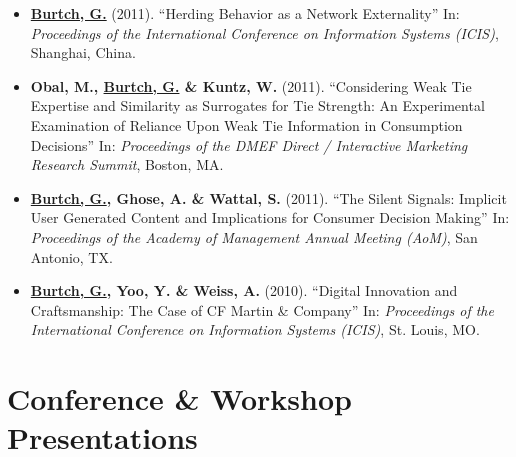 \documentclass[10.5pt,letterpaper,sans]{moderncv}        %
\begin{document}
\begin{itemize}
\item \textbf{\underline{Burtch, G.}} (2011). ``Herding Behavior as a Network Externality'' In: \textit{Proceedings of the International Conference on Information Systems (ICIS)}, Shanghai, China.

\item \textbf{Obal, M., \underline{Burtch, G.} \& Kuntz, W.} (2011). ``Considering Weak Tie Expertise and Similarity as Surrogates for Tie Strength: An Experimental Examination of Reliance Upon Weak Tie Information in Consumption Decisions'' In: \textit{Proceedings of the DMEF Direct / Interactive Marketing Research Summit}, Boston, MA.

\item \textbf{\underline{Burtch, G.}, Ghose, A. \& Wattal, S.} (2011). ``The Silent Signals: Implicit User Generated Content and Implications for Consumer Decision Making'' In: \textit{Proceedings of the Academy of Management Annual Meeting (AoM)}, San Antonio, TX.

\item \textbf{\underline{Burtch, G.}, Yoo, Y. \& Weiss, A.} (2010). ``Digital Innovation and Craftsmanship: The Case of CF Martin \& Company'' In: \textit{Proceedings of the International Conference on Information Systems (ICIS)}, St. Louis, MO.

\end{itemize}

 
\section{Conference \& Workshop Presentations}
\end{document}
